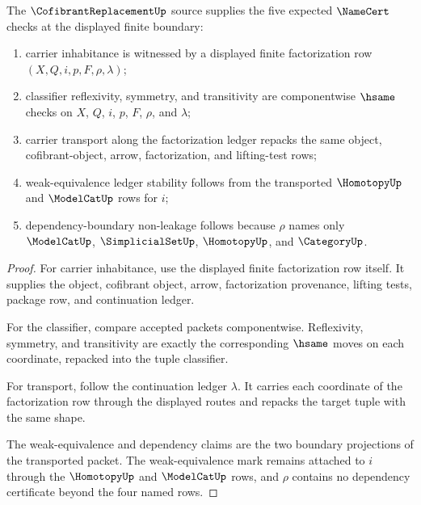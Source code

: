 \begin{theorem}
\label{thm:cofibrantreplacement-five-row-namecert-sketch}
The $\CofibrantReplacementUp$ source supplies the five expected $\NameCert$ checks at the displayed finite boundary:
\begin{enumerate}
\item carrier inhabitance is witnessed by a displayed finite factorization row $(X,Q,i,p,F,\rho,\lambda)$;
\item classifier reflexivity, symmetry, and transitivity are componentwise $\hsame$ checks on $X$, $Q$, $i$, $p$, $F$, $\rho$, and $\lambda$;
\item carrier transport along the factorization ledger repacks the same object, cofibrant-object, arrow, factorization, and lifting-test rows;
\item weak-equivalence ledger stability follows from the transported $\HomotopyUp$ and $\ModelCatUp$ rows for $i$;
\item dependency-boundary non-leakage follows because $\rho$ names only $\ModelCatUp$, $\SimplicialSetUp$, $\HomotopyUp$, and $\CategoryUp$.
\end{enumerate}
\end{theorem}
\begin{proof}
For carrier inhabitance, use the displayed finite factorization row itself. It supplies the object, cofibrant object, arrow, factorization provenance, lifting tests, package row, and continuation ledger.

For the classifier, compare accepted packets componentwise. Reflexivity, symmetry, and transitivity are exactly the corresponding $\hsame$ moves on each coordinate, repacked into the tuple classifier.

For transport, follow the continuation ledger $\lambda$. It carries each coordinate of the factorization row through the displayed routes and repacks the target tuple with the same shape.

The weak-equivalence and dependency claims are the two boundary projections of the transported packet. The weak-equivalence mark remains attached to $i$ through the $\HomotopyUp$ and $\ModelCatUp$ rows, and $\rho$ contains no dependency certificate beyond the four named rows.
\end{proof}



